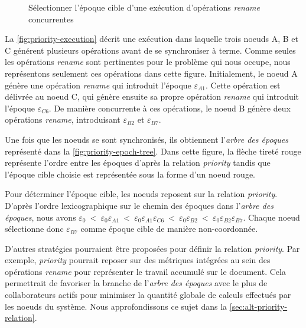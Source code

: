 \documentclass[12pt]{thesul}
\newcommand{\epoch}[1]{$\varepsilon_{#1}$}
\begin{document}
\begin{figure}[!ht]
{\begin{minipage}{\linewidth}
          \label{fig:priority-epoch-tree}
      \end{minipage}}
  \caption{Sélectionner l'époque cible d'une exécution d'opérations \emph{rename} concurrentes}
  \label{fig:priority-example}
\end{figure}

La \autoref{fig:priority-execution} décrit une exécution dans laquelle trois noeuds A, B et C générent plusieurs opérations avant de se synchroniser à terme.
Comme seules les opérations \emph{rename} sont pertinentes pour le problème qui nous occupe, nous représentons seulement ces opérations dans cette figure.
Initialement, le noeud A génère une opération \emph{rename} qui introduit l'époque \epoch{A1}.
Cette opération est délivrée au noeud C, qui génère ensuite sa propre opération \emph{rename} qui introduit l'époque \epoch{C6}.
De manière concurrente à ces opérations, le noeud B génère deux opérations \emph{rename}, introduisant \epoch{B2} et \epoch{B7}.

Une fois que les noeuds se sont synchronisés, ils obtiennent l'\emph{arbre des époques} représenté dans la \autoref{fig:priority-epoch-tree}.
Dans cette figure, la flèche tireté rouge représente l'ordre entre les époques d'après la relation \emph{priority} tandis que l'époque cible choisie est représentée sous la forme d'un noeud rouge.

Pour déterminer l'époque cible, les noeuds reposent sur la relation \emph{priority}.
D'après l'ordre lexicographique sur le chemin des époques dans l'\emph{arbre des époques}, nous avons \epoch{0}~<~\epoch{0}\epoch{A1}~<~\epoch{0}\epoch{A1}\epoch{C6}~<~\epoch{0}\epoch{B2}~<~\epoch{0}\epoch{B2}\epoch{B7}.
Chaque noeud sélectionne donc \epoch{B7} comme époque cible de manière non-coordonnée.

D'autres stratégies pourraient être proposées pour définir la relation \emph{priority}.
Par exemple, \emph{priority} pourrait reposer sur des métriques intégrées au sein des opérations \emph{rename} pour représenter le travail accumulé sur le document.
Cela permettrait de favoriser la branche de l'\emph{arbre des époques} avec le plus de collaborateurs actifs pour minimiser la quantité globale de calculs effectués par les noeuds du système.
Nous approfondissons ce sujet dans la \autoref{sec:alt-priority-relation}.
\end{document}
